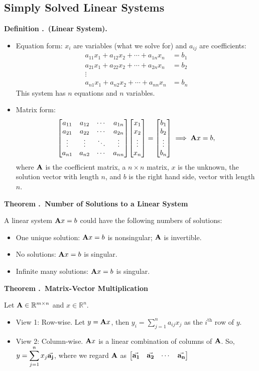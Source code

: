 \documentclass[12pt, a4paper]{article}
\newcounter{index}[subsection]
\newenvironment*{df}[1]{\par\noindent\textbf{Definition \thesubsection.\stepcounter{index}\theindex\ (#1).}}{\par}
\newenvironment*{thm}[1]{\begin{tcolorbox}\par\noindent\textbf{Theorem \thesubsection.\stepcounter{index}\theindex\ #1} \par}{\par\end{tcolorbox}}
\def\R{{\mathbb{R}}}
\def\A{\vb A}
\def\dsst{\displaystyle}
\begin{document}
\subsection{Simply Solved Linear Systems}
\begin{df}{Linear System}
	\begin{itemize}
		\item Equation form: $x_i$ are variables (what we solve for) and $a_{ij}$ are coefficients: \begin{align*}a_{11}x_1+a_{12}x_2+\cdots+a_{1n}x_n&=b_1\\a_{21}x_1+a_{22}x_2+\cdots+a_{2n}x_n&=b_2\\\vdots\\a_{n1}x_1+a_{n2}x_2+\cdots+a_{nn}x_n&=b_n\end{align*} This system has $n$ equations and $n$ variables. 
		\item Matrix form: \[\mqty[a_{11}&a_{12}&\cdots&a_{1n}\\a_{21}&a_{22}&\cdots&a_{2n}\\\vdots&\vdots&\ddots&\vdots\\a_{n1}&a_{n2}&\cdots&a_{nn}]\mqty[x_1\\x_2\\\vdots\\x_n]=\mqty[b_1\\b_2\\\vdots\\b_n]\implies \A x=b,\] where $\A$ is the coefficient matrix, a $n\times n$ matrix, $x$ is the unknown, the solution vector with length $n$, and $b$ is the right hand side, vector with length $n$.
	\end{itemize}	
\end{df}
\begin{thm}{Number of Solutions to a Linear System}
	A linear system $\A x=b$ could have the following numbers of solutions: 
	\begin{itemize}
		\item One unique solution: $\A x=b$ is nonsingular; $\A$ is invertible.
		\item No solutions: $\A x=b$ is singular.
		\item Infinite many solutions: $\A x=b$ is singular. 
	\end{itemize}	
\end{thm}
\begin{thm}{Matrix-Vector Multiplication}
	Let $\A\in\R^{m\times n}$ and $x\in\R^n$. 
	\begin{itemize}
		\item View 1: Row-wise. Let $y=\A x$, then $\dsst y_i=\sum_{j=1}^n a_{ij}x_j$ as the $i^\text{th}$ row of $y$. 
		\item View 2: Column-wise. $\A x$ is a linear combination of columns of $\A$. So, $\dsst y=\sum_{j=1}^nx_j\va{a_j}$, where we regard $\A$ as $\mqty[\va{a_1}&\va{a_2}&\cdots&\va{a_n}]$
	\end{itemize}	
\end{thm}
\end{document}
